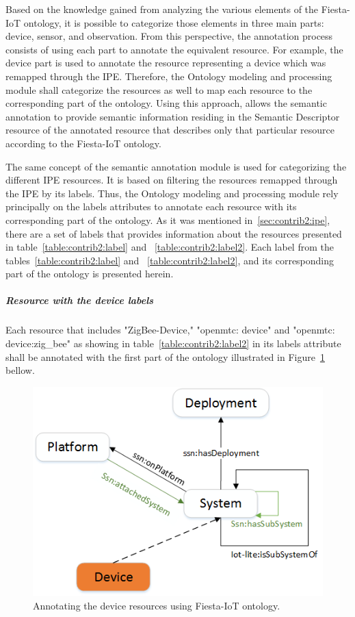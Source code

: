 Based on the knowledge gained from analyzing the various elements of the Fiesta-IoT ontology, it is possible to categorize those elements in three main parts: device, sensor, and observation. From this perspective, the annotation process consists of using each part to annotate the equivalent resource. For example, the device part is used to annotate the resource representing a device which was remapped through the IPE. Therefore, the Ontology modeling and processing module shall categorize the resources as well to map each resource to the corresponding part of the ontology. Using this approach, allows the semantic annotation to provide semantic information residing in the Semantic Descriptor resource of the annotated resource that describes only that particular resource according to the Fiesta-IoT ontology.\par
The same concept of the semantic annotation module is used for categorizing the different IPE resources. It is based on filtering the resources remapped through the IPE by its labels. Thus, the Ontology modeling and processing module rely principally on the labels attributes to annotate each resource with its corresponding part of the ontology. As it was mentioned in~\ref{sec:contrib2:ipe}, there are a set of labels that provides information about the resources presented in table~\ref{table:contrib2:label} and ~\ref{table:contrib2:label2}. Each label from the tables~\ref{table:contrib2:label} and ~\ref{table:contrib2:label2}, and its corresponding part of the ontology is presented herein. 
\subparagraph*{Resource with the device labels }
Each resource that includes "ZigBee-Device," "openmtc: device" and "openmtc: device:zig\_bee" as showing in table~\ref{table:contrib2:label2} in its labels attribute shall be annotated with the first part of the ontology illustrated in Figure~\ref{fig:contrib2:fiestadevice} bellow.

\begin{figure}[htbp]
    \centering
    \includegraphics[width=.7\textwidth]{resources/images/device}
    \caption{Annotating the device resources using Fiesta-IoT ontology. }\label{fig:contrib2:fiestadevice}
\end{figure}

